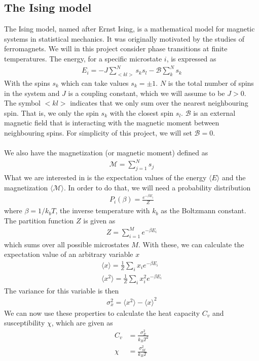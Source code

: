 \documentclass[12pt]{article}
\begin{document}
\subsection{The Ising model}
The Ising model, named after Ernst Ising, is a mathematical model for magnetic systems in statistical mechanics. It was originally motivated by the studies of ferromagnets. We will in this project consider phase transitions at finite temperatures. The energy, for a specific microstate $i$, is expressed as
\begin{align*}
E_i = -J \displaystyle \sum^N_{< kl >}s_ks_l - \mathcal{B}\sum^N_k s_k
\end{align*}
With the spins $s_k$ which can take values $s_k = \pm 1$. $N$ is the total number of spins in the system and $J$ is a coupling constant, which we will assume to be $J>0$. The symbol $< kl >$ indicates that we only sum over the nearest neighbouring spin. That is, we only the spin $s_k$ with the closest spin $s_l$. $\mathcal{B}$ is an external magnetic field that is interacting with the magnetic moment between neighbouring spins. For simplicity of this project, we will set $\mathcal{B} = 0$.\\\\
We also have the magnetization (or magnetic moment) defined as
\begin{align*}
\mathcal{M} = \displaystyle \sum^N_{j=1} s_j
\end{align*}
What we are interested in is the expectation values of the energy $\langle E \rangle$ and the magnetization $\langle \mathcal{M} \rangle$. In order to do that, we will need a probability distribution
\begin{align*}
P_i(\beta) = \frac{e^{-\beta E_i}}{Z}
\end{align*}
where $\beta = 1/k_bT$, the inverse temperature with $k_b$ as the Boltzmann constant. The partition function $Z$ is given as
\begin{align}
Z = \displaystyle \sum_{i=1}^M e^{-\beta E_i}
\label{eq:Partition_func}
\end{align}
which sums over all possible microstates $M$. With these, we can calculate the expectation value of an arbitrary variable $x$
\begin{align*}
\langle x \rangle = \frac{1}{Z}\sum_i x_i e^{-\beta E_i} \\
\langle x^2 \rangle = \frac{1}{Z}\sum_i x_i^2 e^{-\beta E_i}
\end{align*} 
The variance for this variable is then
\begin{align*}
\sigma_x^2 = \langle x^2 \rangle - \langle x \rangle^2
\end{align*}
We can now use these properties to calculate the heat capacity $C_v$ and susceptibility $\chi$, which are given as
\begin{align*}
C_v &= \frac{\sigma_E^2}{k_BT^2} \\
\chi &= \frac{\sigma_M^2}{k_BT}
\end{align*}
\end{document}
